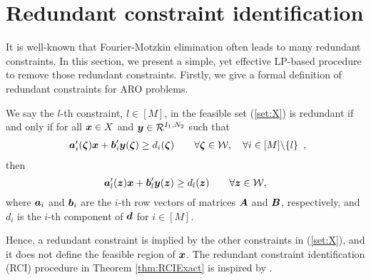 \documentclass[fleqn,orsc,blindrev]{informs4}
\newcommand{\mb}[1]{\mbox{\boldmath \ensuremath{#1}}}
\begin{document}
	
	
	\section{Redundant constraint identification} \label{sec:RCI}
	
	It is well-known that Fourier-Motzkin elimination often leads to many redundant constraints. In this section, we present a simple, yet effective LP-based procedure to remove those redundant constraints. Firstly, we give a formal definition of redundant constraints for ARO problems. 
	\begin{definition} \label{def:RC1}
		We say the $l$-th constraint, $l\in [M]$, in the feasible set (\ref{set:X})  is redundant if and only if  for all $\mb{x} \in X$ and $\mb{y}\in \mathcal{R}^{I_1,N_2}$ such that
\begin{equation}\label{con:RCI}
				\begin{array}{rcll}
					\mb{a}'_i(\mb{\zeta})\mb{x}+\mb{b}'_i \mb{y}(\mb{\zeta}) \geq d_i(\mb{\zeta}) \qquad \forall \mb{\zeta} \in  \mathcal{W}, \quad \forall i  \in [M] \backslash \{l\} 
				\end{array},
\end{equation}
			then 
\begin{equation}  \label{con:RCI2}
				\mb{a}'_l(\mb{z})\mb{x}+\mb{b}'_l \mb{y}(\mb{z}) \geq d_l(\mb{z})  \qquad \forall \mb{z}  \in \mathcal{W},
\end{equation}
			where $\mb{a}_i$ and $\mb{b}_i$ are the $i$-th row vectors of matrices $\mb{A}$ and $\mb{B}$, respectively, and $d_i$ is the $i$-th component of $\mb{d}$ for $i\in [M]$.
		\end{definition}
		
		Hence, a redundant constraint is implied by the other constraints in (\ref{set:X}), and it does not define the feasible region of $\mb{x}$. The redundant constraint identification (RCI) procedure in Theorem \ref{thm:RCIExact} is inspired by \cite{cmp89}.
		
\end{document}
